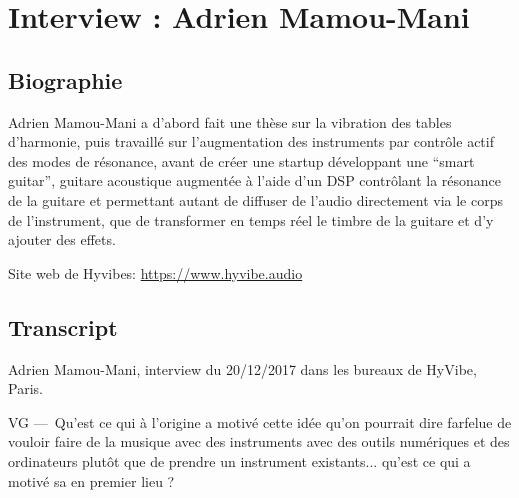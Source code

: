 \chapter{Interview : Adrien Mamou-Mani}
\label{appendix:mamou-mani}

\section*{Biographie}

\noindent Adrien Mamou-Mani a d'abord fait une thèse sur la vibration des tables d'harmonie, puis travaillé sur l'augmentation des instruments par contrôle actif des modes de résonance, avant de créer une startup développant une ``smart guitar'', guitare acoustique augmentée à l'aide d'un \gls{DSP} contrôlant la résonance de la guitare et permettant autant de diffuser de l'audio directement via le corps de l'instrument, que de transformer en temps réel le timbre de la guitare et d'y ajouter des effets.

\noindent Site web de Hyvibes: \url{https://www.hyvibe.audio}


\section*{Transcript}

\noindent Adrien Mamou-Mani, interview du 20/12/2017 dans les bureaux de HyVibe, Paris.

VG — Qu'est ce qui à l'origine a motivé cette idée qu'on pourrait dire farfelue de vouloir faire de la musique avec des instruments avec des outils numériques et des ordinateurs plutôt que de prendre un instrument existants... qu'est ce qui a motivé sa en premier lieu ?


